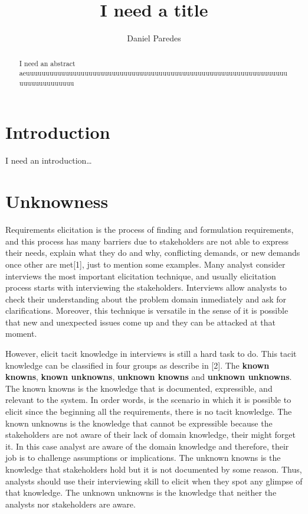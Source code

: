 \documentclass[]{llncs}
\institute{FH Dortmund, \\ \texttt{}}
\title{I need a title}
\author{Daniel Paredes}
\date{}
\begin{document}
\maketitle
\begin{abstract}
I need an abstract
aeuuuuuuuuuuuuuuuuuuuuuuuuuuuuuuuuuuuuuuuuuuuuuuuuuuuuuuuuuuuuuuuuuuuuuuuuuuuuuuuuu


\end{abstract}

\hypertarget{introduction}{%
\section{Introduction}\label{introduction}}

I need an introduction\ldots{}

\hypertarget{unknowness}{%
\section{Unknowness}\label{unknowness}}

Requirements elicitation is the process of finding and formulation
requirements, and this process has many barriers due to stakeholders are
not able to express their needs, explain what they do and why,
conflicting demands, or new demands once other are met{[}1{]}, just to
mention some examples. Many analyst consider interviews the most
important elicitation technique, and usually elicitation process starts
with interviewing the stakeholders. Interviews allow analysts to check
their understanding about the problem domain inmediately and ask for
clarifications. Moreover, this technique is versatile in the sense of it
is possible that new and unexpected issues come up and they can be
attacked at that moment.

However, elicit tacit knowledge in interviews is still a hard task to
do. This tacit knowledge can be classified in four groups as describe in
{[}2{]}. The \textbf{known knowns}, \textbf{known unknowns},
\textbf{unknown knowns} and \textbf{unknown unknowns}. The known knowns
is the knowledge that is documented, expressible, and relevant to the
system. In order words, is the scenario in which it is possible to
elicit since the beginning all the requirements, there is no tacit
knowledge. The known unknowns is the knowledge that cannot be
expressible because the stakeholders are not aware of their lack of
domain knowledge, their might forget it. In this case analyst are aware
of the domain knowledge and therefore, their job is to challenge
assumptions or implications. The unknown knowns is the knowledge that
stakeholders hold but it is not documented by some reason. Thus,
analysts should use their interviewing skill to elicit when they spot
any glimpse of that knowledge. The unknown unknowns is the knowledge
that neither the analysts nor stakeholders are aware.
\end{document}
